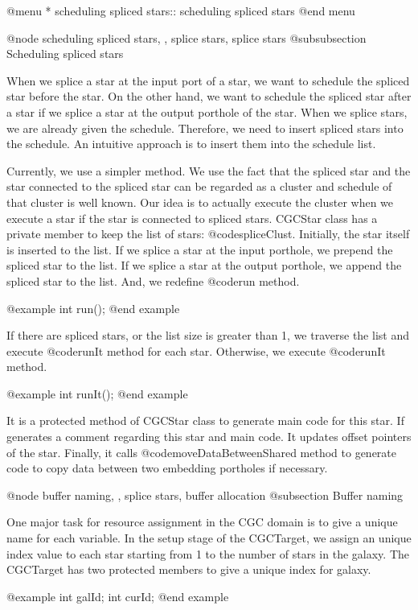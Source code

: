 {@menu
* scheduling spliced stars::		scheduling spliced stars
@end menu

@node scheduling spliced stars, , splice stars, splice stars
@subsubsection Scheduling spliced stars

When we splice a star at the input port of a star, we want to
schedule the spliced star before the star. On the other hand, we want
to schedule the spliced star after a star if we splice a star at the
output porthole of the star. When we splice stars, we are already given
the schedule. Therefore, we need to insert spliced stars into the
schedule. An intuitive approach is to insert them into the schedule list.

Currently, we use a simpler method. We use the fact that the spliced
star and the star connected to the spliced star can be regarded as a
cluster and schedule of that cluster is well known. Our idea is to
actually execute the cluster when we execute a star if the star is connected
to spliced stars. CGCStar class has a private member to keep the
list of stars: @code{spliceClust}. Initially, the star itself is
inserted to the list. If we splice a star at the input porthole, we
prepend the spliced star to the list. If we splice a star at the output
porthole, we append the spliced star to the list. And, we redefine
@code{run} method.

@example
int run();
@end example

If there are spliced stars, or the list size is greater than 1, we
traverse the list and execute @code{runIt} method for each star. Otherwise,
we execute @code{runIt} method.

@example
int runIt();
@end example

It is a protected method of CGCStar class to generate main code for this
star. If generates a comment regarding this star and main code. It updates
offset pointers of the star. Finally, it calls @code{moveDataBetweenShared}
method to generate code to copy data between two embedding portholes if
necessary.

@node buffer naming, , splice stars, buffer allocation
@subsection Buffer naming

One major task for resource assignment in the CGC domain is to give
a unique name for each variable. In the setup stage of the CGCTarget,
we assign an unique index value to each star starting from 1 to the number
of stars in the galaxy. The CGCTarget has two protected members to
give a unique index for galaxy. 

@example
int galId;
int curId;
@end example

}
